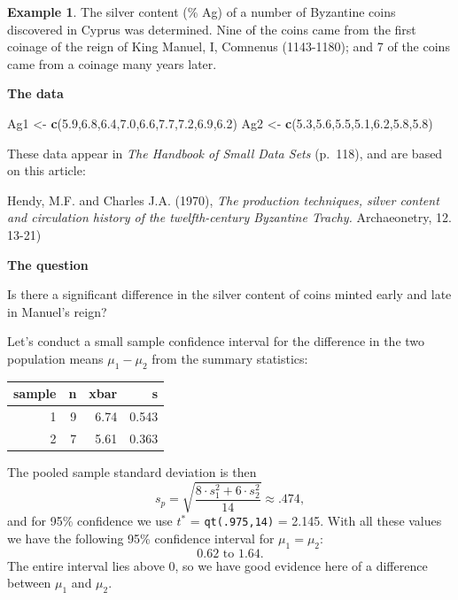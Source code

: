 \documentclass[
]{book}
\newenvironment{Shaded}{\begin{snugshade}}{\end{snugshade}}
\newcommand{\FloatTok}[1]{\textcolor[rgb]{0.00,0.00,0.81}{#1}}
\newcommand{\FunctionTok}[1]{\textcolor[rgb]{0.13,0.29,0.53}{\textbf{#1}}}
\newcommand{\NormalTok}[1]{#1}
\newcommand{\OtherTok}[1]{\textcolor[rgb]{0.56,0.35,0.01}{#1}}
\theoremstyle{definition}
\theoremstyle{definition}
\newtheorem{example}{Example}[chapter]
\theoremstyle{definition}
\theoremstyle{definition}
\theoremstyle{remark}
\begin{document}
\begin{example}
The silver content (\% Ag) of a number of Byzantine coins discovered in Cyprus was determined. Nine of the coins came from the first coinage of the reign of King Manuel, I, Comnenus (1143-1180); and 7 of the coins came from a coinage many years later.

\textbf{The data}

\begin{Shaded}
\begin{Highlighting}[]
\NormalTok{Ag1 }\OtherTok{\textless{}{-}} \FunctionTok{c}\NormalTok{(}\FloatTok{5.9}\NormalTok{,}\FloatTok{6.8}\NormalTok{,}\FloatTok{6.4}\NormalTok{,}\FloatTok{7.0}\NormalTok{,}\FloatTok{6.6}\NormalTok{,}\FloatTok{7.7}\NormalTok{,}\FloatTok{7.2}\NormalTok{,}\FloatTok{6.9}\NormalTok{,}\FloatTok{6.2}\NormalTok{)}
\NormalTok{Ag2 }\OtherTok{\textless{}{-}} \FunctionTok{c}\NormalTok{(}\FloatTok{5.3}\NormalTok{,}\FloatTok{5.6}\NormalTok{,}\FloatTok{5.5}\NormalTok{,}\FloatTok{5.1}\NormalTok{,}\FloatTok{6.2}\NormalTok{,}\FloatTok{5.8}\NormalTok{,}\FloatTok{5.8}\NormalTok{) }
\end{Highlighting}
\end{Shaded}

These data appear in \emph{The Handbook of Small Data Sets} (p.~118), and are based on this article:

Hendy, M.F. and Charles J.A. (1970), \emph{The production techniques, silver content and circulation history of the twelfth-century Byzantine Trachy.} Archaeonetry, 12. 13-21)

\textbf{The question}

Is there a significant difference in the silver content of coins minted early and late in Manuel's reign?

Let's conduct a small sample confidence interval for the difference in the two population means \(\mu_1 - \mu_2\) from the summary statistics:

\begin{table}[!h]
\centering
\begin{tabular}[t]{r|r|r|r}
\hline
sample & n & xbar & s\\
\hline
1 & 9 & 6.74 & 0.543\\
\hline
2 & 7 & 5.61 & 0.363\\
\hline
\end{tabular}
\end{table}

The pooled sample standard deviation is then \[s_p = \sqrt{\frac{8\cdot s_1^2 + 6 \cdot s_2^2}{14}} \approx .474,\]
and for 95\% confidence we use \(t^*\) = \texttt{qt(.975,14)} = 2.145. With all these values we have the following 95\% confidence interval for \(\mu_1 = \mu_2\): \[0.62 \text{ to } 1.64.\]
The entire interval lies above 0, so we have good evidence here of a difference between \(\mu_1\) and \(\mu_2\).
\end{example}
\end{document}
